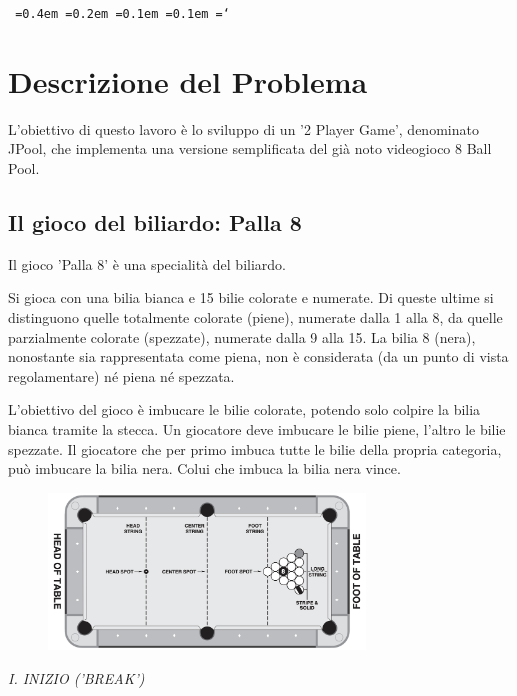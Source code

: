 \documentclass[12pt,a4paper]{report}
\newcommand*\justify{
  \fontdimen2\font=0.4em
  \fontdimen3\font=0.2em
  \fontdimen4\font=0.1em
  \fontdimen7\font=0.1em
  \hyphenchar\font=`\-
}
\begin{document}
\tableofcontents %

\texttt{\justify}

\chapter{Descrizione del Problema}\label{ch:Problem Description} %
L'obiettivo di questo lavoro è lo sviluppo di un '2 Player Game', denominato JPool, che implementa una versione semplificata del già noto videogioco 8 Ball Pool.

\section{Il gioco del biliardo: Palla 8}\label{se:8 Ball Pool} %
Il gioco 'Palla 8' è una specialità del biliardo. \cite{Rules}

\vspace{3mm}

Si gioca con una bilia bianca e 15 bilie colorate e numerate.
Di queste ultime si distinguono quelle totalmente colorate (piene), numerate dalla 1 alla 8, da quelle parzialmente colorate (spezzate), numerate dalla 9 alla 15.
La bilia 8 (nera), nonostante sia rappresentata come piena, non è considerata (da un punto di vista regolamentare) né piena né spezzata.

\vspace{3mm}

L'obiettivo del gioco è imbucare le bilie colorate, potendo solo colpire la bilia bianca tramite la stecca.
Un giocatore deve imbucare le bilie piene, l'altro le bilie spezzate.
Il giocatore che per primo imbuca tutte le bilie della propria categoria, può imbucare la bilia nera.
Colui che imbuca la bilia nera vince.

\begin{figure}
	\center
	\includegraphics[width=0.75\textwidth]{PoolSplit.png}
\end{figure}

\noindent \emph{I. INIZIO ('BREAK')}
\end{document}
